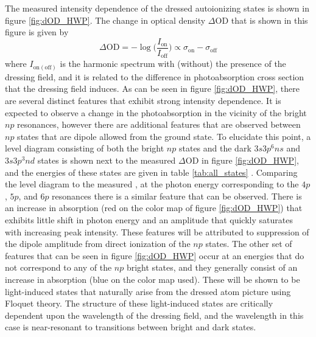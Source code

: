 The measured intensity dependence of the dressed autoionizing states is shown in figure \ref{fig:dOD_HWP}.  The change in optical density $\Delta\mathrm{OD}$ that is shown in this figure is given by
\begin{equation}
\label{eqn:OD_def}
	\Delta\mathrm{OD} = -\log\bigg(\frac{I_{\mathrm{on}}}{I_{\mathrm{off}}}\bigg) \propto \sigma_{\mathrm{on}} - \sigma_{\mathrm{off}}
\end{equation}
where $I_{\mathrm{on} (\mathrm{off})}$ is the harmonic spectrum with (without) the presence of the dressing field, and it is related to the difference in photoabsorption cross section that the dressing field induces.  As can be seen in figure \ref{fig:dOD_HWP}, there are several distinct features that exhibit strong intensity dependence.  It is expected to observe a change in the photoabsorption in the vicinity of the bright $np$ resonances, however there are additional features that are observed between $np$ states that are dipole allowed from the ground state.  To elucidate this point, a level diagram consisting of both the bright $np$ states and the dark $3s3p^6ns$ and $3s3p^3nd$ states is shown next to the measured $\Delta\mathrm{OD}$ in figure \ref{fig:dOD_HWP}, and the energies of these states are given in table \ref{tab:all_states} \cite{caretteMulticonfigurationalHartreeFockClosecoupling2013, brionThresholdElectronImpact1970, fryarAnalysisEjectedelectronSpectra1976, juretaEnergyAngularAnalysis2016, ogurtsovAutoIonizationStatesArgon1970, sorensenArgon3sAutoionization1994}. Comparing the level diagram to the measured \dod, at the photon energy corresponding to the $4p$, $5p$, and $6p$ resonances there is a similar feature that can be observed.  There is an increase in absorption (red on the color map of figure \ref{fig:dOD_HWP}) that exhibits little shift in photon energy and an amplitude that quickly saturates with increasing peak intensity.  These features will be attributed to suppression of the dipole amplitude from direct ionization of the $np$ states.  The other set of features that can be seen in figure \ref{fig:dOD_HWP} occur at an energies that do not correspond to any of the $np$ bright states, and they generally consist of an increase in absorption (blue on the color map used).  These will be shown to be light-induced states that naturally arise from the dressed atom picture using Floquet theory.  The structure of these light-induced states are critically dependent upon the wavelength of the dressing field, and the wavelength in this case is near-resonant to transitions between bright and dark states.  
